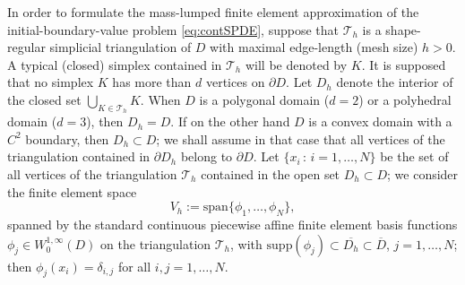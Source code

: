 \documentclass[12pt]{article}
\begin{document}
In order to formulate the mass-lumped finite element approximation of the initial-boundary-value problem \eqref{eq:contSPDE}, suppose that $\mathcal{T}_h$ is a shape-regular simplicial triangulation of $D$ with maximal edge-length (mesh size) $h>0$. A typical (closed)  simplex contained in $\mathcal{T}_h$ will be denoted by $K$. It is supposed that no simplex $K$ has more than $d$ vertices on $\partial D$. Let $D_h$ denote the interior of the closed set $\bigcup_{K \in \mathcal{T}_h} K$. 
When $D$ is a polygonal domain ($d=2$) or a polyhedral domain ($d=3$), then $D_h=D$. If on the other hand $D$ is a convex domain with a $C^2$ boundary, then $D_h \subset D$; we shall assume in that case that all vertices of the triangulation contained in $\partial D_h$ belong to $\partial D$. Let $\{x_i\,:\, i=1,\ldots, N\}$ be the set of all vertices of the triangulation $\mathcal{T}_h$ contained in the open set $D_h \subset D$; we consider
the finite element space 
%
\begin{equation}
    V_h:= \mbox{span}\{\phi_1,  \ldots, \phi_N\},
\end{equation}
%
spanned by the standard continuous piecewise affine finite element basis functions $\phi_j \in  W^{1,\infty}_0(D)$ on the triangulation $\mathcal{T}_h$, with $\mathrm{supp}(\phi_j) \subset \overline{D_h}\subset \overline{D}$, $j=1, \ldots, N$; then $\phi_j(x_i) = \delta_{i,j}$ for all $i,j=1,\ldots,N$.
\end{document}

